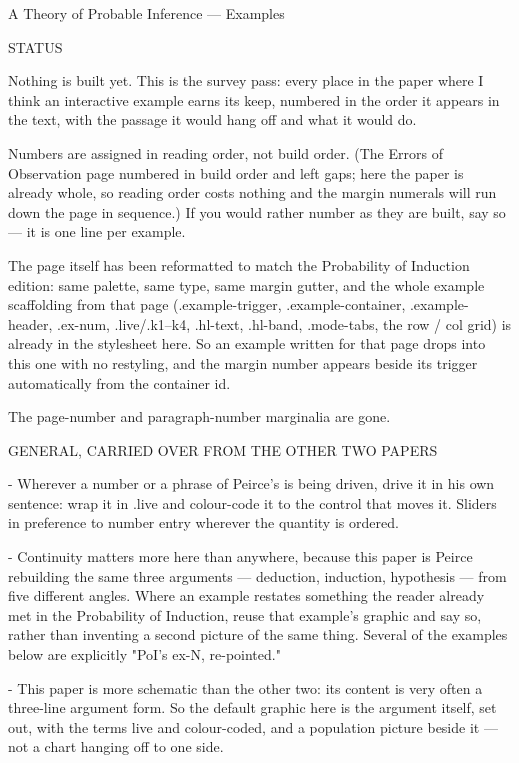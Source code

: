 A Theory of Probable Inference — Examples


STATUS

Nothing is built yet. This is the survey pass: every place in the paper where I
think an interactive example earns its keep, numbered in the order it appears in
the text, with the passage it would hang off and what it would do.

Numbers are assigned in reading order, not build order. (The Errors of
Observation page numbered in build order and left gaps; here the paper is
already whole, so reading order costs nothing and the margin numerals will run
down the page in sequence.) If you would rather number as they are built, say
so — it is one line per example.

The page itself has been reformatted to match the Probability of Induction
edition: same palette, same type, same margin gutter, and the whole example
scaffolding from that page (.example-trigger, .example-container,
.example-header, .ex-num, .live/.k1–k4, .hl-text, .hl-band, .mode-tabs, the row
/ col grid) is already in the stylesheet here. So an example written for that
page drops into this one with no restyling, and the margin number appears beside
its trigger automatically from the container id.

The page-number and paragraph-number marginalia are gone.


GENERAL, CARRIED OVER FROM THE OTHER TWO PAPERS

- Wherever a number or a phrase of Peirce's is being driven, drive it in his own
  sentence: wrap it in .live and colour-code it to the control that moves it.
  Sliders in preference to number entry wherever the quantity is ordered.

- Continuity matters more here than anywhere, because this paper is Peirce
  rebuilding the same three arguments — deduction, induction, hypothesis — from
  five different angles. Where an example restates something the reader already
  met in the Probability of Induction, reuse that example's graphic and say so,
  rather than inventing a second picture of the same thing. Several of the
  examples below are explicitly "PoI's ex-N, re-pointed."

- This paper is more schematic than the other two: its content is very often a
  three-line argument form. So the default graphic here is the argument itself,
  set out, with the terms live and colour-coded, and a population picture beside
  it — not a chart hanging off to one side.

